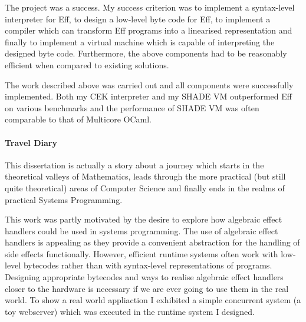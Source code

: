 \documentclass[class=article, crop=false]{standalone}
\begin{document}
The project was a success. My success criterion was to implement a 
syntax-level interpreter for Eff, to design a low-level byte code for Eff,
to implement a compiler which can transform Eff programs into a linearised
representation and finally to implement a virtual machine which is capable of
interpreting the designed byte code. Furthermore, the above components had to be
reasonably efficient when compared to existing solutions.

The work described above was carried out and all components were successfully
implemented. Both my CEK interpreter and my SHADE VM outperformed Eff on various
benchmarks and the performance of SHADE VM was often comparable to that of
Multicore OCaml.

\paragraph{Travel Diary}

This dissertation is actually a story about a journey
which starts in the theoretical valleys of Mathematics, leads through the more
practical (but still quite theoretical) areas of Computer Science and finally
ends in the realms of practical Systems Programming.

This work was partly motivated by the desire to explore how algebraic effect
handlers could be used in systems programming. The use of algebraic effect
handlers is appealing as they provide a convenient abstraction for the handling
of side effects functionally. However, efficient runtime systems often work
with low-level bytecodes rather than with syntax-level representations of
programs. Designing appropriate bytecodes and ways to realise algebraic effect
handlers closer to the hardware is necessary if we are ever
going to use them in the real world. To show a real world appliaction
I exhibited a simple concurrent system (a toy webserver) which was executed
in the runtime system I designed. 

\begin{comment}
In the Implementation chapter an implementation of a higher level CEK evaluator
(interpreting source terms) was described along with its abstract machine
semantics. Furthermore, the SECD-like SHADE VM is derived for Eff as well as
its instruction set (SHADEcode). A compiler is designed from Eff to SHADEcode.
The SHADE machine is my own ``invention'', although it turned out to be rather
similar to how Multicore OCaml implements algebraic effect handlers
\footnote{In particular, shadows and fibres seem to be almost the same.}.

The Evaluation chapter was concerned with comparing the CEK evaluator and the
SHADE VM to existing solutions, namely Multicore OCaml and the official
Eff interpreter. We found that the SHADE VM is reasonably efficient even without
implementing any optimisations. It was also shown how algebraic effects and
their handlers could be used for systems programming by exhibiting a toy web
server implementation in Eff.
\end{comment}
\end{document}
